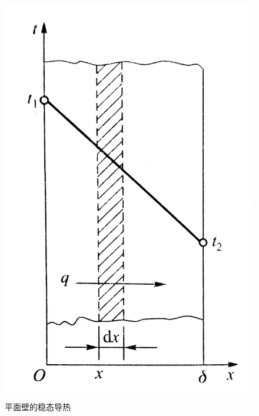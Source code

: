 \begin{figure}[!htb]
\begin{minipage}{0.3\linewidth}
		\includegraphics[width=\linewidth]{pic/平面壁.jpeg}
		\vspace*{-3em}
		\caption{平面壁的稳态导热}
		\label{平面壁}
	\end{minipage}
	\end{figure}

